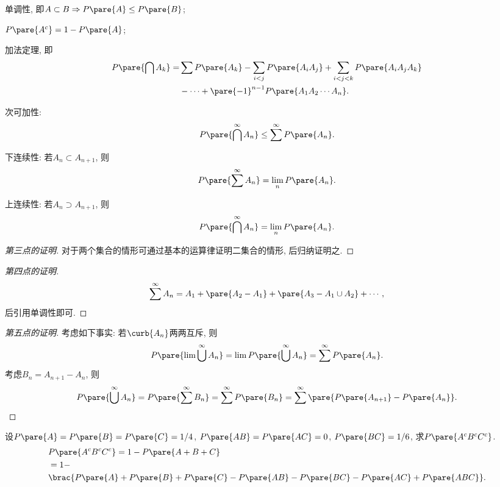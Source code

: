 \documentclass[../Statistics.tex]{subfiles}
\begin{document}
\begin{finale}
    \begin{corollary}
        \mbox{}
        \begin{cenum}
            \item 单调性, 即$A\subset B\Rightarrow P\pare{A}\le P\pare{B}$;
            \item $P\pare{A^c} = 1-P\pare{A}$;
            \item 加法定理, 即
            \begin{align*}
                P\pare{\bigcap A_k} =& \sum P\pare{A_k} - \sum_{i<j}P\pare{A_iA_j} + \sum_{i<j<k}P\pare{A_iA_jA_k} \\
                & - \cdots + \pare{-1}^{n-1}P\pare{A_1A_2\cdots A_n}. 
            \end{align*}
            \item 次可加性:
            \[ P\pare{\bigcap^\infty A_n}\le \sum^\infty P\pare{A_n}. \]
            \item 下连续性: 若$A_n\subset A_{n+1}$, 则
            \[ P\pare{\sum^\infty A_n} = \lim_n P\pare{A_n}. \]
            \item 上连续性: 若$A_n \supset A_{n+1}$, 则
            \[ P\pare{\bigcap^\infty A_n} = \lim_n P\pare{A_n}. \]
        \end{cenum}
    \end{corollary}
\end{finale}
\begin{proof}[第三点的证明]
    对于两个集合的情形可通过基本的运算律证明二集合的情形, 后归纳证明之.
\end{proof}
\begin{proof}[第四点的证明]
    \[ \sum^\infty A_n = A_1 + \pare{A_2-A_1} + \pare{A_3 - A_1\cup A_2} + \cdots, \]
    后引用单调性即可.
\end{proof}
\begin{proof}[第五点的证明]
    考虑如下事实: 若$\curb{A_n}$两两互斥, 则
    \[ P\pare{\lim \bigcup^\infty A_n} = \lim P\pare{\bigcup^\infty A_n} = \sum^\infty P\pare{A_n}. \]
    考虑$B_n = A_{n+1} - A_n$, 则
    \[ P\pare{\bigcup^\infty A_n} = P\pare{\sum^\infty B_n} = \sum^\infty P\pare{B_n} = \sum^\infty \pare{P\pare{A_{n+1}} - P\pare{A_n}}. \qedhere \]
\end{proof}
\begin{sample}
    \begin{ex}
        设$P\pare{A} = P\pare{B} = P\pare{C} = 1/4$, $P\pare{AB}= P\pare{AC} = 0$, $P\pare{BC} = 1/6$, 求$P\pare{A^cB^cC^c}$.
        \begin{align*}
            &P\pare{A^cB^cC^c} = 1-P\pare{A+B+C} \\
            &= 1-\\&\brac{P\pare{A} + P\pare{B} + P\pare{C} - P\pare{AB} - P\pare{BC} - P\pare{AC} + P\pare{ABC}}.
        \end{align*}
    \end{ex}
\end{sample}
\end{document}
